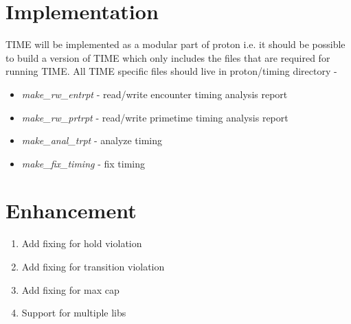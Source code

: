 \documentclass[11pt]{article}
\begin{document}
\section{Implementation}
TIME will be implemented as a modular part of proton i.e. it should be possible to build a version of TIME which only includes the files that are required for running TIME. All TIME specific files should live in proton/timing directory - 
\begin{itemize}
\item \emph{make\_rw\_entrpt}  - read/write encounter timing analysis report
\item \emph{make\_rw\_prtrpt}  - read/write primetime timing analysis report
\item \emph{make\_anal\_trpt}  - analyze timing
\item \emph{make\_fix\_timing} - fix timing
\end{itemize}

\section{Enhancement}
\begin{enumerate}
\item Add fixing for hold violation
\item Add fixing for transition violation
\item Add fixing for max cap
\item Support for multiple libs
\end{enumerate}

 
\end{document}
